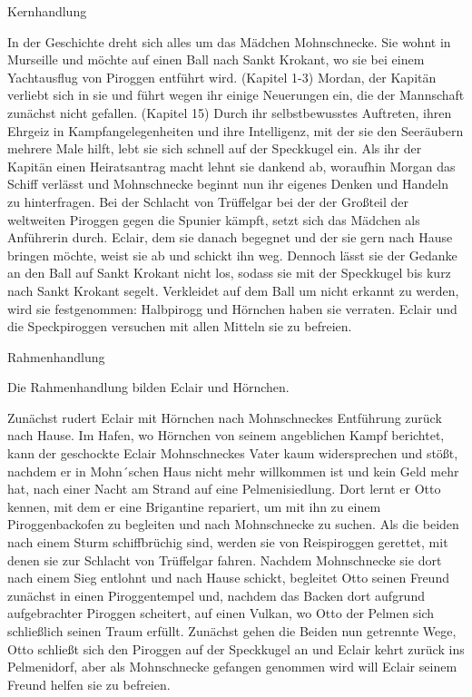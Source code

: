 Kernhandlung

In der Geschichte dreht sich alles um das Mädchen Mohnschnecke. Sie wohnt in Murseille und möchte auf einen Ball nach Sankt Krokant, wo sie bei einem Yachtausflug von Piroggen entführt wird. (Kapitel 1-3) Mordan, der Kapitän verliebt sich in sie und führt wegen ihr einige Neuerungen ein, die der Mannschaft zunächst nicht gefallen. (Kapitel 15) Durch ihr selbstbewusstes Auftreten, ihren Ehrgeiz in Kampfangelegenheiten und ihre Intelligenz, mit der sie den Seeräubern mehrere Male hilft, lebt sie sich schnell auf der Speckkugel ein. Als ihr der Kapitän einen Heiratsantrag macht lehnt sie dankend ab, woraufhin Morgan das Schiff verlässt und Mohnschnecke beginnt nun ihr eigenes Denken und Handeln zu hinterfragen. Bei der Schlacht von Trüffelgar bei der der Großteil der weltweiten Piroggen gegen die Spunier kämpft, setzt sich das Mädchen als Anführerin durch. Eclair, dem sie danach begegnet und der sie gern nach Hause bringen möchte, weist sie ab und schickt ihn weg. Dennoch lässt sie der Gedanke an den Ball auf Sankt Krokant nicht los, sodass sie mit der Speckkugel bis kurz nach Sankt Krokant segelt. Verkleidet auf dem Ball um nicht erkannt zu werden, wird sie festgenommen: Halbpirogg und Hörnchen haben sie verraten. Eclair und die Speckpiroggen versuchen mit allen Mitteln sie zu befreien.

Rahmenhandlung

Die Rahmenhandlung bilden Eclair und Hörnchen.

Zunächst rudert Eclair mit Hörnchen nach Mohnschneckes Entführung zurück nach Hause. Im Hafen, wo Hörnchen von seinem angeblichen Kampf berichtet, kann der geschockte Eclair Mohnschneckes Vater kaum widersprechen und stößt, nachdem er in Mohn´schen Haus nicht mehr willkommen ist und kein Geld mehr hat, nach einer Nacht am Strand auf eine Pelmenisiedlung. Dort lernt er Otto kennen, mit dem er eine Brigantine repariert, um mit ihn zu einem Piroggenbackofen zu begleiten und nach Mohnschnecke zu suchen. Als die beiden nach einem Sturm schiffbrüchig sind, werden sie von Reispiroggen gerettet, mit denen sie zur Schlacht von Trüffelgar fahren. Nachdem Mohnschnecke sie dort nach einem Sieg entlohnt und nach Hause schickt, begleitet Otto seinen Freund zunächst in einen Piroggentempel und, nachdem das Backen dort aufgrund aufgebrachter Piroggen scheitert, auf einen Vulkan, wo Otto der Pelmen sich schließlich seinen Traum erfüllt. Zunächst gehen die Beiden nun getrennte Wege, Otto schließt sich den Piroggen auf der Speckkugel an und Eclair kehrt zurück ins Pelmenidorf, aber als Mohnschnecke gefangen genommen wird will Eclair seinem Freund helfen sie zu befreien.

